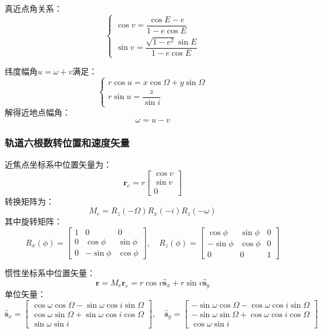 \documentclass[12pt,a4paper]{article}
\begin{document}
真近点角关系：
$$
\begin{cases}
\cos v = \dfrac{\cos E - e}{1 - e \cos E} \\
\sin v = \dfrac{\sqrt{1 - e^2} \sin E}{1 - e \cos E}
\end{cases}
$$

纬度幅角$u = \omega + v$满足：
$$
\begin{cases}
r \cos u = x \cos\Omega + y \sin\Omega \\
r \sin u = \dfrac{z}{\sin i}
\end{cases}
$$
解得近地点幅角：
$$
\omega = u - v
$$



\subsubsection{轨道六根数转位置和速度矢量}

近焦点坐标系中位置矢量为：
$$
\mathbf{r}_e = r \begin{bmatrix} \cos v \\ \sin v \\ 0 \end{bmatrix}
$$
转换矩阵为：
$$
M_e = R_z(-\Omega) R_x(-i) R_z(-\omega)
$$
其中旋转矩阵：
$$
R_x(\phi) = \begin{bmatrix}
1 & 0 & 0 \\
0 & \cos\phi & \sin\phi \\
0 & -\sin\phi & \cos\phi
\end{bmatrix}, \quad
R_z(\phi) = \begin{bmatrix}
\cos\phi & \sin\phi & 0 \\
-\sin\phi & \cos\phi & 0 \\
0 & 0 & 1
\end{bmatrix}
$$

惯性坐标系中位置矢量：
$$
\mathbf{r} = M_e \mathbf{r}_e = r \cos v \hat{\mathbf{s}}_x + r \sin v \hat{\mathbf{s}}_y
$$
单位矢量：
$$
\hat{\mathbf{s}}_x = \begin{bmatrix}
\cos\omega \cos\Omega - \sin\omega \cos i \sin\Omega \\
\cos\omega \sin\Omega + \sin\omega \cos i \cos\Omega \\
\sin\omega \sin i
\end{bmatrix}, \quad
\hat{\mathbf{s}}_y = \begin{bmatrix}
-\sin\omega \cos\Omega - \cos\omega \cos i \sin\Omega \\
-\sin\omega \sin\Omega + \cos\omega \cos i \cos\Omega \\
\cos\omega \sin i
\end{bmatrix}
$$
\end{document}

